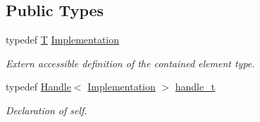 \subsection*{Public Types}
\begin{DoxyCompactItemize}
\item 
typedef \hyperlink{class_t}{T} \hyperlink{class_d_d4hep_1_1_handle_ad7ff728a25806079516b8965b9113f1a}{Implementation}
\begin{DoxyCompactList}\small\item\em Extern accessible definition of the contained element type. \end{DoxyCompactList}\item 
typedef \hyperlink{class_d_d4hep_1_1_handle}{Handle}$<$ \hyperlink{class_d_d4hep_1_1_handle_ad7ff728a25806079516b8965b9113f1a}{Implementation} $>$ \hyperlink{class_d_d4hep_1_1_handle_a3d9df9d5b334e984b288ffbabcacb564}{handle\+\_\+t}
\begin{DoxyCompactList}\small\item\em Declaration of \textquotesingle{}self\textquotesingle{}. \end{DoxyCompactList}\end{DoxyCompactItemize}
